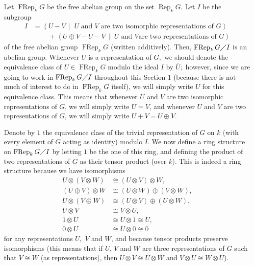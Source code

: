 \documentclass[numbers=enddot,12pt,final,onecolumn,notitlepage]{scrartcl}%
\begin{document}
Let $\operatorname*{FRep}_{k}G$ be the free abelian group on the set
$\operatorname*{Rep}_{k}G$. Let $I$ be the subgroup%
\begin{align*}
I  &  =\left\langle U-V\ \mid\ U\text{ and }V\text{ are two isomorphic
representations of }G\right\rangle \\
&  \ \ \ \ \ \ \ \ \ \ +\left\langle U\oplus V-U-V\ \mid\ U\text{ and }V\text{
are two representations of }G\right\rangle
\end{align*}
of the free abelian group $\operatorname*{FRep}_{k}G$ (written additively).
Then, $\operatorname*{FRep}_{k}G\diagup I$ is an abelian group. Whenever $U$
is a representation of $G,$ we should denote the equivalence class of
$U\in\operatorname*{FRep}_{k}G$ modulo the ideal $I$ by $\overline{U};$
however, since we are going to work in $\operatorname*{FRep}_{k}G\diagup I$
throughout this Section 1 (because there is not much of interest to do in
$\operatorname*{FRep}_{k}G$ itself), we will simply write $U$ for this
equivalence class. This means that whenever $U$ and $V$ are two isomorphic
representations of $G$, we will simply write $U=V$, and whenever $U$ and $V$
are two representations of $G$, we will simply write $U+V=U\oplus V$.

Denote by $1$ the equivalence class of the trivial representation of $G$ on
$k$ (with every element of $G$ acting as identity) modulo $I$. We now define a
ring structure on $\operatorname*{FRep}_{k}G\diagup I$ by letting $1$ be the
one of this ring, and defining the product of two representations of $G$ as
their tensor product (over $k$). This is indeed a ring structure because we
have isomorphisms%
\begin{align*}
U\otimes\left(  V\otimes W\right)   &  \cong\left(  U\otimes V\right)  \otimes
W,\\
\left(  U\oplus V\right)  \otimes W  &  \cong\left(  U\otimes W\right)
\oplus\left(  V\otimes W\right)  ,\\
U\otimes\left(  V\oplus W\right)   &  \cong\left(  U\otimes V\right)
\oplus\left(  U\otimes W\right)  ,\\
U\otimes V  &  \cong V\otimes U,\\
1\otimes U  &  \cong U\otimes1\cong U,\\
0\otimes U  &  \cong U\otimes0\cong0
\end{align*}
for any representations $U,$ $V$ and $W$, and because tensor products preserve
isomorphisms (this means that if $U$, $V$ and $W$ are three representations of
$G$ such that $V\cong W$ (as representations), then $U\otimes V\cong U\otimes
W$ and $V\otimes U\cong W\otimes U$).
\end{document}
